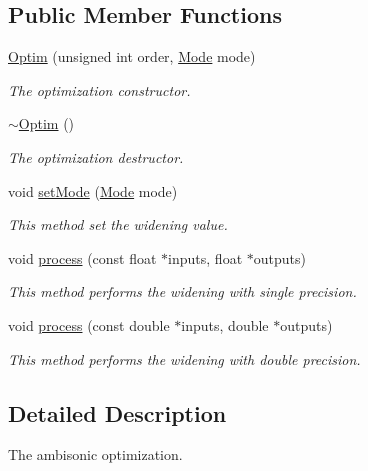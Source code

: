 \subsection*{Public Member Functions}
\begin{DoxyCompactItemize}
\item 
\hyperlink{class_hoa3_d_1_1_optim_ab53ffe61910a75637afafb7f4f3ba788}{Optim} (unsigned int order, \hyperlink{class_hoa3_d_1_1_optim_a1a153ac21e7a112279824f17981cf147}{Mode} mode)
\begin{DoxyCompactList}\small\item\em The optimization constructor. \end{DoxyCompactList}\item 
\hyperlink{class_hoa3_d_1_1_optim_a11c05a8b458f79ba09f4eefad63e0b20}{$\sim$\-Optim} ()
\begin{DoxyCompactList}\small\item\em The optimization destructor. \end{DoxyCompactList}\item 
void \hyperlink{class_hoa3_d_1_1_optim_abb49c9e6a327bc62ac6491cd3046a10a}{set\-Mode} (\hyperlink{class_hoa3_d_1_1_optim_a1a153ac21e7a112279824f17981cf147}{Mode} mode)
\begin{DoxyCompactList}\small\item\em This method set the widening value. \end{DoxyCompactList}\item 
void \hyperlink{class_hoa3_d_1_1_optim_a13f8cb746e5bcc3c096bd0c0bf1a6435}{process} (const float $\ast$inputs, float $\ast$outputs)
\begin{DoxyCompactList}\small\item\em This method performs the widening with single precision. \end{DoxyCompactList}\item 
void \hyperlink{class_hoa3_d_1_1_optim_a6c2e7ce20ec5f98e9e609040144ea99d}{process} (const double $\ast$inputs, double $\ast$outputs)
\begin{DoxyCompactList}\small\item\em This method performs the widening with double precision. \end{DoxyCompactList}\end{DoxyCompactItemize}


\subsection{Detailed Description}
The ambisonic optimization. 

